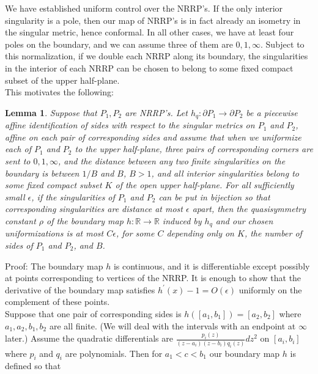 \documentclass[12pt]{article}
\newtheorem{lemma}[theorem]{Lemma}
\newcommand{\rr}{\mathbb{R}}
\begin{document}
\noindent We have established uniform control over the NRRP's. If the only interior singularity is a pole, then our map of NRRP's is in fact already an isometry in the singular metric, hence conformal. In all other cases, we have at least four poles on the boundary, and we can assume three of them are $0,1,\infty$. Subject to this normalization, if we double each NRRP along its boundary, the singularities in the interior of each NRRP can be chosen to belong to some fixed compact subset of the upper half-plane.\\

\noindent This motivates the following:\\

\begin{lemma}Suppose that $P_1,P_2$ are NRRP's. Let $h_q: \partial P_1 \to \partial P_2$ be a piecewise affine identification of sides with respect to the singular metrics on $P_1$ and $P_2$, affine on each pair of corresponding sides and assume that when we uniformize each of $P_1$ and $P_2$ to the upper half-plane, three pairs of corresponding corners are sent to $0,1,\infty$, and the distance between any two finite singularities on the boundary is between $1/B$ and $B$, $B > 1$, and all interior singularities belong to some fixed compact subset $K$ of the open upper half-plane. For all sufficiently small $\epsilon$, if the singularities of $P_1$ and $P_2$ can be put in bijection so that corresponding singularities are distance at most $\epsilon$ apart, then the quasisymmetry constant $\rho$ of the boundary map $h: \rr \to \rr$ induced by $h_q$ and our chosen uniformizations is at most $C\epsilon$, for some $C$ depending only on $K$, the number of sides of $P_1$ and $P_2$, and $B$.\end{lemma}

\noindent Proof: The boundary map $h$ is continuous, and it is differentiable except possibly at points corresponding to vertices of the NRRP. It is enough to show that the derivative of the boundary map satisfies $h^\prime(x) - 1 = O(\epsilon)$ uniformly on the complement of these points. \\

\noindent Suppose that one pair of corresponding sides is $h([a_1,b_1]) = [a_2,b_2]$ where $a_1,a_2,b_1,b_2$ are all finite. (We will deal with the intervals with an endpoint at $\infty$ later.) Assume the quadratic differentials are $\frac{p_i(z)}{(z - a_i)(z - b_i)q_i(z)}dz^2$ on $[a_i,b_i]$ where $p_i$ and $q_i$ are polynomials. Then for $a_1 < c < b_1$ our boundary map $h$ is defined so that
\end{document}
